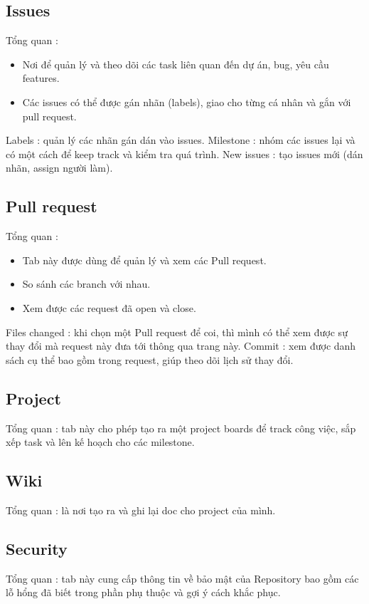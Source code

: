 \documentclass[a4paper]{report}
\begin{document}
\subsection{Issues}
\textrm{Tổng quan :}
\begin{itemize}
    \item Nơi để quản lý và theo dõi các task liên quan đến dự án, bug, yêu cầu features.
    \item Các issues có thể được gán nhãn (labels), giao cho từng cá nhân và gắn với pull request.
\end{itemize}
\textrm{Labels : quản lý các nhãn gán dán vào issues.}
\newline
\textrm{Milestone : nhóm các issues lại và có một cách để keep track và kiểm tra quá trình.}
\newline
\textrm{New issues : tạo issues mới (dán nhãn, assign người làm).}

\subsection{Pull request}
\textrm{Tổng quan :}
\begin{itemize}
    \item Tab này được dùng để quản lý và xem các Pull request.
    \item So sánh các branch với nhau.
    \item {Xem được các request đã open và close.}
\end{itemize}
\textrm{Files changed : khi chọn một Pull request để coi, thì mình có thể xem được sự thay đổi mà request này đưa tới thông qua trang này.}
\newline
\textrm{Commit : xem được danh sách cụ thể bao gồm trong request, giúp theo dõi lịch sử thay đổi.}

\subsection{Project}
\textrm{Tổng quan : tab này cho phép tạo ra một project boards để track công việc, sắp xếp task và lên kế hoạch cho các milestone.}

\subsection{Wiki}
\textrm{Tổng quan : là nơi tạo ra và ghi lại doc cho project của mình.}

\subsection{Security}
\textrm{Tổng quan : tab này cung cấp thông tin về bảo mật của Repository bao gồm các lỗ hổng đã biết trong phần phụ thuộc và gợi ý cách khắc phục.}
\end{document}
